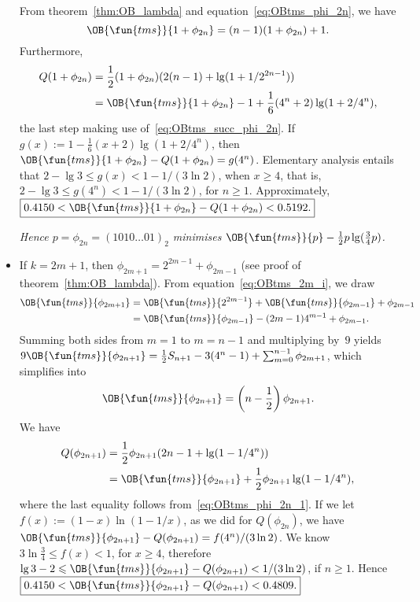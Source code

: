 \begin{itemize}
    From theorem~\ref{thm:OB_lambda} and
    equation~\eqref{eq:OBtms_phi_2n}, we have
    \begin{equation}
      \OB{\fun{tms}}{1+\phi_{2n}} = (n-1)(1+\phi_{2n}) + 1.
      \label{eq:OBtms_succ_phi_2n}
    \end{equation}
    Furthermore,
    \begin{align*}
      Q(1+\phi_{2n}) &= \frac{1}{2}(1+\phi_{2n}) (2(n-1) + \lg(1+1/2^{2n-1}))\\
                    &= \OB{\fun{tms}}{1+\phi_{2n}} - 1 +
      \frac{1}{6}(4^n + 2)\lg(1+2/4^n),
    \end{align*}
    the last step making use of~\eqref{eq:OBtms_succ_phi_2n}. If \(g(x) := 1 -
    \tfrac{1}{6}(x+2)\lg(1+2/4^n)\), then
    \(\OB{\fun{tms}}{1+\phi_{2n}} - Q(1+\phi_{2n}) =
    g(4^n)\). Elementary analysis entails that \(2 - \lg 3 \leqslant
    g(x) < 1 - 1/(3\ln 2)\), when \(x \geqslant 4\), that is, \(2 -
    \lg 3 \leqslant g(4^n) < 1 - 1/(3\ln 2)\), for \(n \geqslant
    1\). Approximately, \(\boxed{0.4150 <
      \smash{\OB{\fun{tms}}{1+\phi_{2n}}} - Q(1+\phi_{2n}) <
      0.5192.}\)

    \bigskip \textsl{Hence \(p=\phi_{2n} = (1010\dots01)_2\) minimises
      \(\OB{\fun{tms}}{p} - \tfrac{1}{2}p\lg(\tfrac{3}{4}p)\).}
    \bigskip

  \item If \(k=2m+1\), then \(\phi_{2m+1} = 2^{2m-1} + \phi_{2m-1}\)
    (see proof of theorem~\ref{thm:OB_lambda}). From
    equation~\eqref{eq:OBtms_2m_i}, we draw
    \begin{align*}
      \OB{\fun{tms}}{\phi_{2m+1}} &= \OB{\fun{tms}}{2^{2m-1}} +
      \OB{\fun{tms}}{\phi_{2m-1}} + \phi_{2m-1}\\
      &= \OB{\fun{tms}}{\phi_{2m-1}} - (2m-1)4^{m-1} +
      \phi_{2m-1}.
    \end{align*}
    Summing both sides from \(m=1\) to \(m=n-1\) and
    multiplying by~\(9\) yields \(9\OB{\fun{tms}}{\phi_{2n+1}} =
    \tfrac{1}{2}S_{n+1} - 3(4^n-1) + \sum_{m=0}^{n-1}\phi_{2m+1}\),
    which simplifies into
    \begin{equation}
      \OB{\fun{tms}}{\phi_{2n+1}} = \left(n - \frac{1}{2}\right)\phi_{2n+1}.
      \label{eq:OBtms_phi_2n_1}
    \end{equation}
    We have
    \begin{align*}
      Q(\phi_{2n+1}) &= \frac{1}{2}\phi_{2n+1}(2n-1 + \lg(1-1/4^n))\\
      &= \OB{\fun{tms}}{\phi_{2n+1}} + \frac{1}{2}\phi_{2n+1}\lg(1-1/4^n),
    \end{align*}
    where the last equality follows from~\eqref{eq:OBtms_phi_2n_1}. If
    we let \(f(x) := (1-x)\ln(1-1/x)\), as we did for
    \(Q(\phi_{2n})\), we have \(\OB{\fun{tms}}{\phi_{2n+1}} -
    Q(\phi_{2n+1}) = f(4^n)/(3\ln 2)\). We know \(3\ln\tfrac{3}{4}
    \leqslant f(x) < 1\), for \(x \geqslant 4\), therefore \(\lg 3 - 2
    \leqslant \OB{\fun{tms}}{\phi_{2n+1}} - Q(\phi_{2n+1}) < 1/(3\ln
    2)\), if \(n \geqslant 1\). Hence \(\boxed{0.4150 <
      \smash{\OB{\fun{tms}}{\phi_{2n+1}}} - Q(\phi_{2n+1}) <
      0.4809.}\)


\end{itemize}
